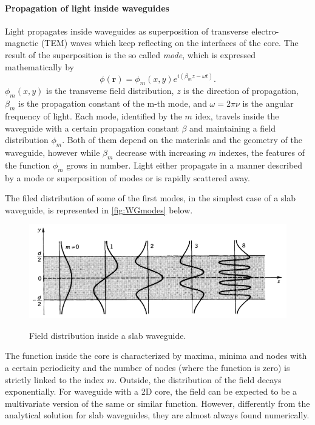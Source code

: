 \paragraph{Propagation of light inside waveguides\\}
\noindent Light propagates inside waveguides as superposition of transverse electro-magnetic (TEM) waves which keep reflecting on the interfaces of the core.
The result of the superposition is the so called \textit{mode}, which is expressed mathematically by
\begin{equation}
	\phi(\textbf{r}) = \phi_m\left( x, y \right) e^{i\left( \beta_m z - \omega t \right)}.
	\label{eq:mode_propagation}
\end{equation}
$\phi_m\left( x, y \right)$ is the transverse field distribution, $z$ is the direction of propagation, $\beta_m$ is the propagation constant of the m-th mode, and $\omega=2\pi \nu$ is the angular frequency of light.
Each mode, identified by the $m$ idex, travels inside the waveguide with a certain propagation constant $\beta$ and maintaining a field distribution $\phi_m$.
Both of them depend on the materials and the geometry of the waveguide, however while $\beta_m$ decrease with increasing $m$ indexes, the features of the function $\phi_m$ grows in number.
Light either propagate in a manner described by a mode or superposition of modes or is rapidly scattered away.

The filed distribution of some of the first modes, in the simplest case of a slab waveguide, is represented in \autoref{fig:WGmodes} below.
\begin{figure}[ht]
	\centering
	\includegraphics[scale=0.8]{figures/modes.png}\\
	
	\caption{Field distribution inside a slab waveguide.}
	\label{fig:WGmodes}
\end{figure}
The function inside the core is characterized by maxima, minima and nodes with a certain periodicity and the number of nodes (where the function is zero) is strictly linked to the index $m$.
Outside, the distribution of the field decays exponentially.
For waveguide with a 2D core, the field can be expected to be a multivariate version of the same or similar function.
However, differently from the analytical solution for slab waveguides, they are almost always found numerically.

